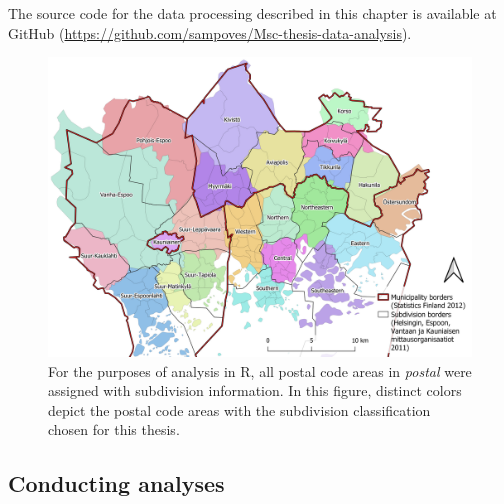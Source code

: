 The source code for the data processing described in this chapter is available at GitHub (\textcolor{blue}{\url{https://github.com/sampoves/Msc-thesis-data-analysis}}).

\begin{figure}[H]%
    \includegraphics[width=\textwidth]{images/thesis_subdiv_place.png}
    \caption[Placing postal code areas in subdivisions]{For the purposes of analysis in R, all postal code areas in \textit{postal} were assigned with subdivision information. In this figure, distinct colors depict the postal code areas with the subdivision classification chosen for this thesis.}%
    \label{fig:subdiv_placement}%
\end{figure}

\subsection{Conducting analyses}
\justify


